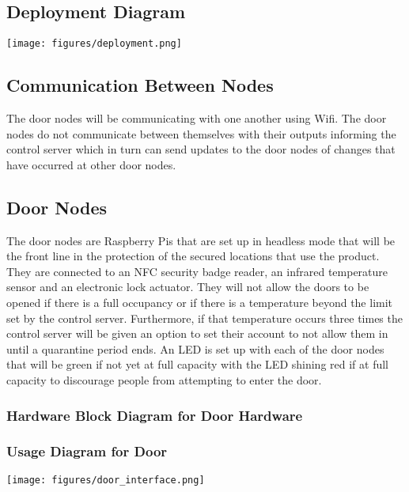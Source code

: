 \subsection{Deployment Diagram}

\texttt{[image: figures/deployment.png]}

\subsection{Communication Between Nodes}
The door nodes will be communicating with one another using Wifi. The door nodes
do not communicate between themselves with their outputs informing the control
server which in turn can send updates to the door nodes of changes that have
occurred at other door nodes.

\subsection{Door Nodes}
The door nodes are Raspberry Pis that are set up in headless mode that will be
the front line in the protection of the secured locations that use the product.
They are connected to an NFC security badge reader, an infrared
temperature sensor and an electronic lock actuator. They will
not allow the doors to be opened if there is a full occupancy or if there is a
temperature beyond the limit set by the control server. Furthermore, if that
temperature occurs three times the control server will be given an option to set
their account to not allow them in until a quarantine period ends. An LED is set
up with each of the door nodes that will be green if not yet at full capacity
with the LED shining red if at full capacity to discourage people from
attempting to enter the door.


\subsubsection{Hardware Block Diagram for Door Hardware}

\subsubsection{Usage Diagram for Door}

\texttt{[image: figures/door\_interface.png]}

